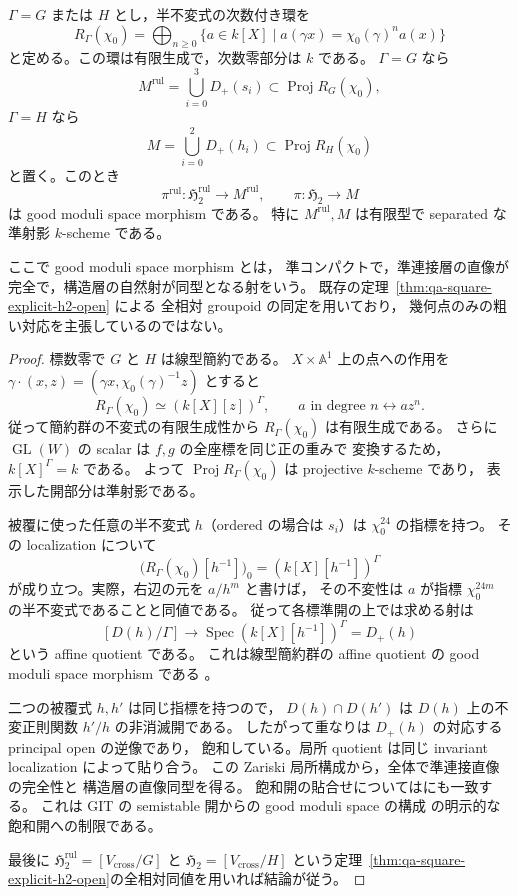 \begin{theorem}
\label{thm:qa-global-h2-quasiprojective-good-moduli}
$\Gamma=G$ または $H$ とし，半不変式の次数付き環を
\[
 R_\Gamma(\chi_0)=
   \bigoplus_{n\geq0}
   \{a\in k[X]\mid a(\gamma x)=\chi_0(\gamma)^n a(x)\}
\]
と定める。この環は有限生成で，次数零部分は $k$ である。
$\Gamma=G$ なら
\[
 M^{\mathrm{rul}}=\bigcup_{i=0}^3D_+(s_i)
             \subset\operatorname{Proj}R_G(\chi_0),
\]
$\Gamma=H$ なら
\[
 M=\bigcup_{i=0}^2D_+(h_i)
             \subset\operatorname{Proj}R_H(\chi_0)
\]
と置く。このとき
\[
 \pi^{\mathrm{rul}}:\mathfrak H_2^{\mathrm{rul}}\longrightarrow M^{\mathrm{rul}},
 \qquad
 \pi:\mathfrak H_2\longrightarrow M
\]
は good moduli space morphism である。
特に $M^{\mathrm{rul}},M$ は有限型で separated な準射影 $k$-scheme である。

ここで good moduli space morphism とは，
準コンパクトで，準連接層の直像が完全で，構造層の自然射が同型となる射をいう。
既存の定理~\ref{thm:qa-square-explicit-h2-open} による
全相対 groupoid の同定を用いており，
幾何点のみの粗い対応を主張しているのではない。
\end{theorem}
\begin{proof}
標数零で $G$ と $H$ は線型簡約である。
$X\times\mathbb A^1$ 上の点への作用を
$\gamma\cdot(x,z)=(\gamma x,\chi_0(\gamma)^{-1}z)$ とすると
\[
 R_\Gamma(\chi_0)\simeq(k[X][z])^\Gamma,\qquad
 a\text{ in degree }n\longleftrightarrow az^n.
\]
従って簡約群の不変式の有限生成性から $R_\Gamma(\chi_0)$ は有限生成である。
さらに $\operatorname{GL}(W)$ の scalar は $f,g$ の全座標を同じ正の重みで
変換するため，$k[X]^\Gamma=k$ である。
よって $\operatorname{Proj}R_\Gamma(\chi_0)$ は projective $k$-scheme であり，
表示した開部分は準射影である。

被覆に使った任意の半不変式 $h$（ordered の場合は $s_i$）は
$\chi_0^{24}$ の指標を持つ。
その localization について
\[
 \bigl(R_\Gamma(\chi_0)[h^{-1}]\bigr)_0
       =(k[X][h^{-1}])^\Gamma
 \tag{LC}\label{eq:qa-h2-localized-invariants}
\]
が成り立つ。実際，右辺の元を $a/h^m$ と書けば，
その不変性は $a$ が指標 $\chi_0^{24m}$ の半不変式であることと同値である。
従って各標準開の上では求める射は
\[
 [D(h)/\Gamma]\longrightarrow
 \operatorname{Spec}(k[X][h^{-1}])^\Gamma
       =D_+(h)
\]
という affine quotient である。
これは線型簡約群の affine quotient の good moduli space morphism である
\cite[Theorem 13.2]{AlperGoodModuli2013}。

二つの被覆式 $h,h'$ は同じ指標を持つので，
$D(h)\cap D(h')$ は $D(h)$ 上の不変正則関数 $h'/h$ の非消滅開である。
したがって重なりは $D_+(h)$ の対応する principal open の逆像であり，
飽和している。局所 quotient は同じ invariant localization によって貼り合う。
この Zariski 局所構成から，全体で準連接直像の完全性と
構造層の直像同型を得る。
飽和開の貼合せについては\cite[Proposition 7.9]{AlperGoodModuli2013}にも一致する。
これは GIT の semistable 開からの good moduli space の構成
\cite[Theorem 13.6]{AlperGoodModuli2013} の明示的な飽和開への制限である。

最後に
$\mathfrak H_2^{\mathrm{rul}}=[V_{\mathrm{cross}}/G]$ と
$\mathfrak H_2=[V_{\mathrm{cross}}/H]$
という定理~\ref{thm:qa-square-explicit-h2-open}の全相対同値を用いれば結論が従う。
\end{proof}

